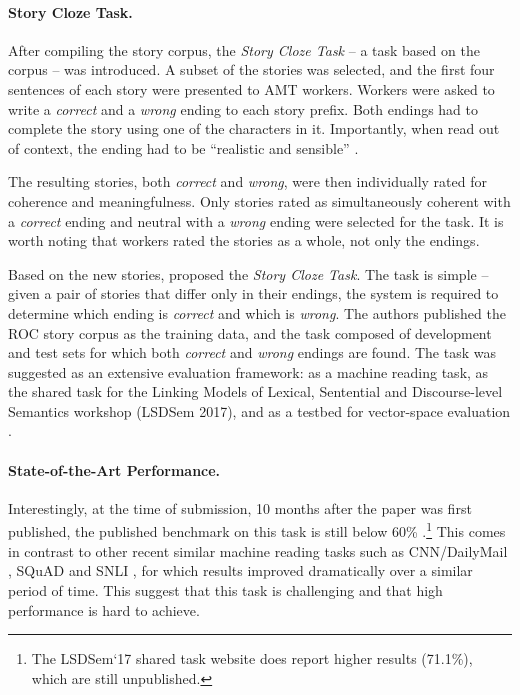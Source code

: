 \documentclass[11pt,a4paper]{article}
\begin{document}
\paragraph{Story Cloze Task.}
After compiling the story corpus, the {\it Story Cloze Task} -- a task based on the corpus -- was introduced.
A subset of the stories was selected, and the first four sentences of each story were presented to AMT workers.
Workers were asked to write a {\it correct} and a {\it wrong} ending to each story prefix. 
Both endings had to complete the story using one of the characters in it.
Importantly,  when read out of context, the ending had to be ``realistic and sensible'' \cite{Mostafazadeh:2016}.

The resulting stories, both {\it correct} and {\it wrong}, were then individually rated for coherence and meaningfulness. 
Only stories rated as simultaneously coherent with a {\it correct} ending and neutral with a {\it wrong} ending were selected for the task. 
It is worth noting that workers rated the stories as a whole, not only the endings.

Based on the new stories, \citet{Mostafazadeh:2016} proposed the {\it Story Cloze Task}. 
The task is simple -- given a pair of stories that differ only in their endings, the system is required to determine which ending is {\it correct} and which is {\it wrong}.
The authors published the ROC story corpus as the training data, and the task composed of development and test sets for which both {\it correct} and {\it wrong} endings are found.
The task was suggested as an extensive evaluation framework:
as a machine reading task, as the shared task for the  Linking Models of Lexical, Sentential and Discourse-level Semantics workshop (LSDSem 2017), and as a testbed for vector-space evaluation \cite{mostafazadeh2016story}.

\paragraph{State-of-the-Art Performance.}
Interestingly, at the time of submission, 10 months after the paper was first published, the published benchmark on this task is still below 60\% \cite{Salle:2016}.\footnote{The LSDSem`17 shared task website does report higher results (71.1\%), which are still unpublished.}
This comes in contrast to other recent similar machine reading tasks such as CNN/DailyMail \cite{hermann2015teaching}, SQuAD \cite{rajpurkar2016squad} and SNLI \cite{bowman2015large}, for which results improved dramatically over a similar period of time.
This suggest that this task is challenging and that high performance is hard to achieve.
\end{document}
